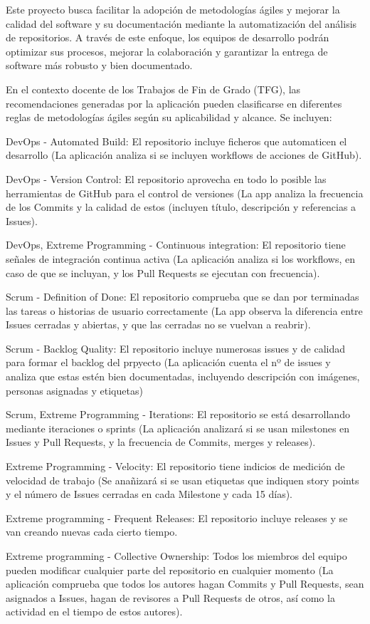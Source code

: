 Este proyecto busca facilitar la adopción de metodologías ágiles y mejorar la calidad del software y su documentación mediante la automatización del análisis de repositorios. A través de este enfoque, los equipos de desarrollo podrán optimizar sus procesos, mejorar la colaboración y garantizar la entrega de software más robusto y bien documentado.

En el contexto docente de los Trabajos de Fin de Grado (TFG), las recomendaciones generadas por la aplicación pueden clasificarse en diferentes reglas de metodologías ágiles según su aplicabilidad y alcance. Se incluyen:

DevOps - Automated Build: El repositorio incluye ficheros que automaticen el desarrollo (La aplicación analiza si se incluyen workflows de acciones de GitHub).

DevOps - Version Control: El repositorio aprovecha en todo lo posible las herramientas de GitHub para el control de versiones (La app analiza la frecuencia de los Commits y la calidad de estos (incluyen título, descripción y referencias a Issues).

DevOps, Extreme Programming - Continuous integration: El repositorio tiene señales de integración continua activa (La aplicación analiza si los workflows, en caso de que se incluyan, y los Pull Requests se ejecutan con frecuencia).

Scrum - Definition of Done: El repositorio comprueba que se dan por terminadas las tareas o historias de usuario correctamente (La app observa la diferencia entre Issues cerradas y abiertas, y que las cerradas no se vuelvan a reabrir).

Scrum - Backlog Quality: El repositorio incluye numerosas issues y de calidad para formar el backlog del prpyecto (La aplicación cuenta el nº de issues y analiza que estas estén bien documentadas, incluyendo descripción con imágenes, personas asignadas y etiquetas)

Scrum, Extreme Programming - Iterations: El repositorio se está desarrollando mediante iteraciones o sprints (La aplicación analizará si se usan milestones en Issues y Pull Requests, y la frecuencia de Commits, merges y releases).

Extreme Programming - Velocity: El repositorio tiene indicios de medición de velocidad de trabajo (Se anañizará si se usan etiquetas que indiquen story points y el número de Issues cerradas en cada Milestone y cada 15 días).

Extreme programming - Frequent Releases: El repositorio incluye releases y se van creando nuevas cada cierto tiempo.

Extreme programming - Collective Ownership: Todos los miembros del equipo pueden modificar cualquier parte del repositorio en cualquier momento (La aplicación comprueba que todos los autores hagan Commits y Pull Requests, sean asignados a Issues, hagan de revisores a Pull Requests de otros, así como la actividad en el tiempo de estos autores).